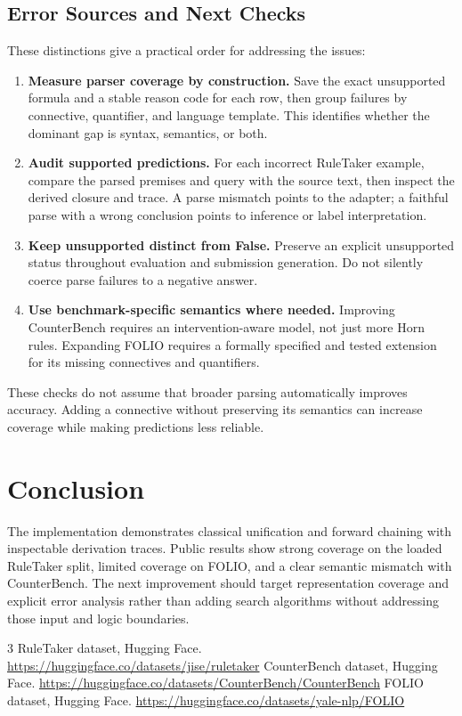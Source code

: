 \documentclass[10pt,twocolumn,letterpaper]{article}
\begin{document}
\subsection{Error Sources and Next Checks}
These distinctions give a practical order for addressing the issues:
\begin{enumerate}
\item \textbf{Measure parser coverage by construction.} Save the exact unsupported formula and a stable reason code for each row, then group failures by connective, quantifier, and language template. This identifies whether the dominant gap is syntax, semantics, or both.
\item \textbf{Audit supported predictions.} For each incorrect RuleTaker example, compare the parsed premises and query with the source text, then inspect the derived closure and trace. A parse mismatch points to the adapter; a faithful parse with a wrong conclusion points to inference or label interpretation.
\item \textbf{Keep unsupported distinct from False.} Preserve an explicit unsupported status throughout evaluation and submission generation. Do not silently coerce parse failures to a negative answer.
\item \textbf{Use benchmark-specific semantics where needed.} Improving CounterBench requires an intervention-aware model, not just more Horn rules. Expanding FOLIO requires a formally specified and tested extension for its missing connectives and quantifiers.
\end{enumerate}
These checks do not assume that broader parsing automatically improves accuracy. Adding a connective without preserving its semantics can increase coverage while making predictions less reliable.

\section{Conclusion}
The implementation demonstrates classical unification and forward chaining with inspectable derivation traces. Public results show strong coverage on the loaded RuleTaker split, limited coverage on FOLIO, and a clear semantic mismatch with CounterBench. The next improvement should target representation coverage and explicit error analysis rather than adding search algorithms without addressing those input and logic boundaries.

\begin{thebibliography}{3}
 RuleTaker dataset, Hugging Face. \url{https://huggingface.co/datasets/jise/ruletaker}
 CounterBench dataset, Hugging Face. \url{https://huggingface.co/datasets/CounterBench/CounterBench}
 FOLIO dataset, Hugging Face. \url{https://huggingface.co/datasets/yale-nlp/FOLIO}
\end{thebibliography}
\end{document}
